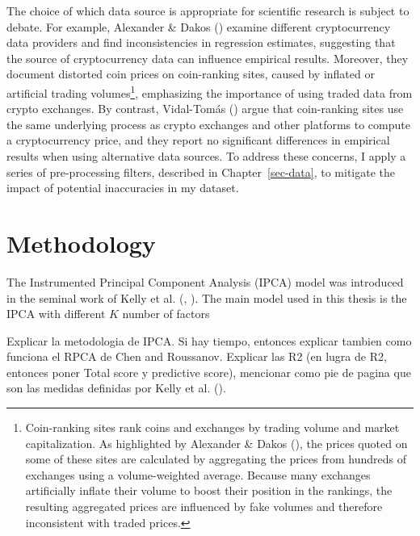 \documentclass[
  12pt,
  a4paper,
  openany]{scrbook}
\begin{document}
The choice of which data source is appropriate for scientific research
is subject to debate. For example, Alexander \& Dakos
() examine
different cryptocurrency data providers and find inconsistencies in
regression estimates, suggesting that the source of cryptocurrency data
can influence empirical results. Moreover, they document distorted coin
prices on coin-ranking sites, caused by inflated or artificial trading
volumes\footnote{Coin-ranking sites rank coins and exchanges by trading
  volume and market capitalization. As highlighted by Alexander \& Dakos
  (), the prices
  quoted on some of these sites are calculated by aggregating the prices
  from hundreds of exchanges using a volume-weighted average. Because
  many exchanges artificially inflate their volume to boost their
  position in the rankings, the resulting aggregated prices are
  influenced by fake volumes and therefore inconsistent with traded
  prices.}, emphasizing the importance of using traded data from crypto
exchanges. By contrast, Vidal-Tomás
() argue that
coin-ranking sites use the same underlying process as crypto exchanges
and other platforms to compute a cryptocurrency price, and they report
no significant differences in empirical results when using alternative
data sources. To address these concerns, I apply a series of
pre-processing filters, described in Chapter~\ref{sec-data}, to mitigate
the impact of potential inaccuracies in my dataset.


\chapter{Methodology}\label{methodology}

The Instrumented Principal Component Analysis (IPCA) model was
introduced in the seminal work of Kelly et al.
(,
). The main model
used in this thesis is the IPCA with different \(K\) number of factors

Explicar la metodologia de IPCA. Si hay tiempo, entonces explicar
tambien como funciona el RPCA de Chen and Roussanov. Explicar las R2 (en
lugra de R2, entonces poner Total score y predictive score), mencionar
como pie de pagina que son las medidas definidas por Kelly et al.
().
\end{document}

